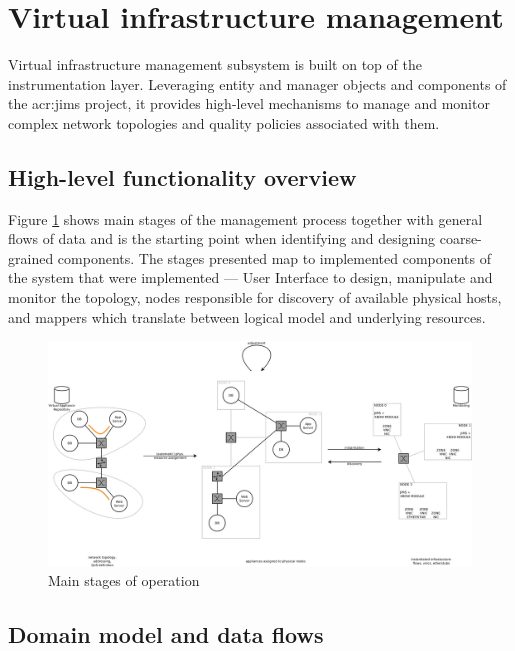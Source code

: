\documentclass[11pt,openany]{book}
\begin{document}
    \section{Virtual infrastructure management}
    \label{sec:arch:vi}

      Virtual infrastructure management subsystem is built on top of the instrumentation layer. Leveraging entity and
      manager objects and components of the \gls{acr:jims} project, it provides high-level mechanisms to manage and
      monitor complex network topologies and quality policies associated with them.


      \subsection{High-level functionality overview}
      \label{sub:arch:hl}

        Figure \ref{fig:arch:hl} shows main stages of the management process together with general flows of data and is
        the starting point when identifying and designing coarse-grained components. The stages presented map to
        implemented components of the system that were implemented --- User Interface to design, manipulate and monitor
        the topology, nodes responsible for discovery of available physical hosts, and mappers which translate between
        logical model and underlying resources.

        \begin{figure}[H]
          \centering
          \includegraphics[width=.8\textwidth]{img/architecture/scope.pdf}

          \caption{Main stages of operation}
          \label{fig:arch:hl}
        \end{figure}


      \subsection{Domain model and data flows}
      \label{sec:domain-model}
\end{document}
